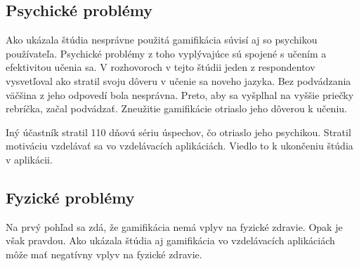\documentclass[10pt,twoside,slovak,a4paper]{article}
\begin{document}
\subsection{Psychické problémy} \label{Vplyv:Psychické problémy}

Ako ukázala štúdia\cite{HadiMogavi2022} nesprávne použitá gamifikácia súvisí aj so psychikou používateľa. Psychické problémy z toho vyplývajúce sú spojené s učením a efektivitou učenia sa. V rozhovoroch v tejto štúdii jeden z respondentov vysvetľoval ako stratil svoju dôveru v učenie sa noveho jazyka. Bez podvádzania väčšina z jeho odpovedí bola nesprávna. Preto, aby sa vyšplhal na vyššie priečky rebríčka, začal podvádzať. Zneužitie gamifikácie otriaslo jeho dôverou k učeniu. 

Iný účastník stratil 110 dňovú sériu úspechov, čo otriaslo jeho psychikou. Stratil motiváciu vzdelávať sa vo vzdelávacích aplikáciách. Viedlo to k ukončeniu štúdia v aplikácii.\cite{HadiMogavi2022}




%
%
%


\subsection{Fyzické problémy} \label{Vplyv:Fyzické problémy}

Na prvý pohľad sa zdá, že gamifikácia nemá vplyv na fyzické zdravie. Opak je však pravdou. Ako ukázala štúdia\cite{HadiMogavi2022} aj gamifikácia vo vzdelávacích aplikáciách môže mať negatívny vplyv na fyzické zdravie.
\end{document}
